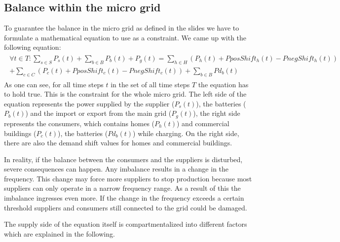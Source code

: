 \subsection{Balance within the micro grid}
To guarantee the balance in the micro grid as defined in the slides we have to formulate a mathematical equation to use as a constraint.
We came up with the following equation:\\
\begin{align} \label{eq1:balance}
\begin{split}
\forall t \in T: \sum\limits_{s \in S}{P_{s}(t)} + \sum\limits_{b \in B}{P_{b}(t)} + P_{g}(t) = \sum_{h \in H}({P_{h}(t)} + PposShift_h(t) - PnegShift_h(t))
\\ + \sum_{c \in C}({P_{c}(t)} + PposShift_c(t) - PnegShift_c(t)) + \sum\limits_{b \in B}{Pd_{b}(t)}
\end{split}
\end{align}
As one can see, for all time steps $t$ in the set of all time steps $T$ the equation has to hold true. 
This is the constraint for the whole micro grid. 
The left side of the equation represents the power supplied by the supplier ($P_{s}(t)$), the batteries ($P_{b}(t)$) and the import or export from the main grid ($P_{g}(t)$), the right side represents the consumers, which contains homes ($P_{h}(t)$) and commercial buildings ($P_{c}(t)$), the batteries ($Pd_{b}(t)$) while charging. 
On the right side, there are also the demand shift values for homes and commercial buildings.

In reality, if the balance between the consumers and the suppliers is disturbed, severe consequences can happen. 
Any imbalance results in a change in the frequency. 
This change may force more suppliers to stop production because most suppliers can only operate in a narrow frequency range. 
As a result of this the imbalance ingresses even more. 
If the change in the frequency exceeds a certain threshold suppliers and consumers still connected to the grid could be damaged. 

The supply side of the equation itself is compartmentalized into different factors which are explained in the following.

